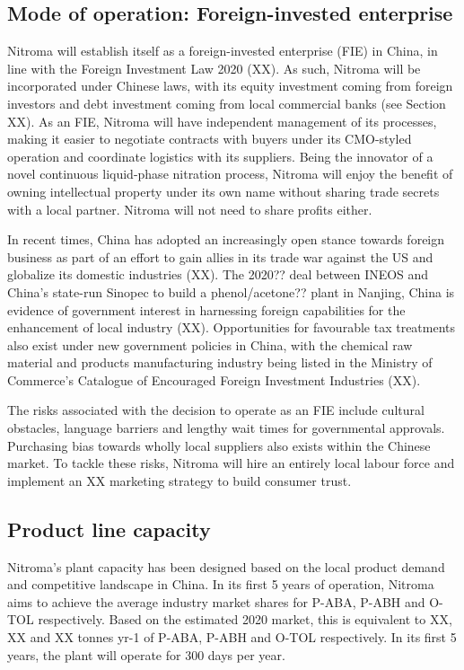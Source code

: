 \subsection{Mode of operation: Foreign-invested enterprise}
Nitroma will establish itself as a foreign-invested enterprise (FIE) in China, in line with the Foreign Investment Law 2020 (XX). As such, Nitroma will be incorporated under Chinese laws, with its equity investment coming from foreign investors and debt investment coming from local commercial banks (see Section XX). As an FIE, Nitroma will have independent management of its processes, making it easier to negotiate contracts with buyers under its CMO-styled operation and coordinate logistics with its suppliers. Being the innovator of a novel continuous liquid-phase nitration process, Nitroma will enjoy the benefit of owning intellectual property under its own name without sharing trade secrets with a local partner. Nitroma will not need to share profits either. 

In recent times, China has adopted an increasingly open stance towards foreign business as part of an effort to gain allies in its trade war against the US and globalize its domestic industries (XX). The 2020?? deal between INEOS and China’s state-run Sinopec to build a phenol/acetone?? plant in Nanjing, China is evidence of government interest in harnessing foreign capabilities for the enhancement of local industry (XX). Opportunities for favourable tax treatments also exist under new government policies in China, with the chemical raw material and products manufacturing industry being listed in the Ministry of Commerce’s Catalogue of Encouraged Foreign Investment Industries (XX). 

The risks associated with the decision to operate as an FIE include cultural obstacles, language barriers and lengthy wait times for governmental approvals. Purchasing bias towards wholly local suppliers also exists within the Chinese market. To tackle these risks, Nitroma will hire an entirely local labour force and implement an XX marketing strategy to build consumer trust.


\subsection{Product line capacity}
Nitroma’s plant capacity has been designed based on the local product demand and competitive landscape in China. In its first 5 years of operation, Nitroma aims to achieve the average industry market shares for P-ABA, P-ABH and O-TOL respectively. Based on the estimated 2020 market, this is equivalent to XX, XX and XX tonnes yr-1 of P-ABA, P-ABH and O-TOL respectively. In its first 5 years, the plant will operate for 300 days per year.

